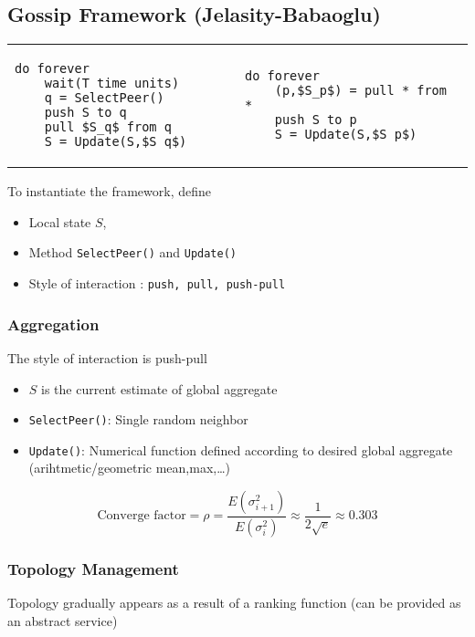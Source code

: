 \subsection{Gossip Framework (Jelasity-Babaoglu)}
\begin{tabular}{m{0.5\linewidth}m{0.5\linewidth}}
\begin{lstlisting}[caption={Active thread}, mathescape]
do forever
    wait(T time units)
    q = SelectPeer()
    push S to q
    pull $S_q$ from q
    S = Update(S,$S_q$)
\end{lstlisting}
&
\begin{lstlisting}[caption={Passive thread}, mathescape]
do forever
    (p,$S_p$) = pull * from *
    push S to p
    S = Update(S,$S_p$)
\end{lstlisting}
\end{tabular}

To instantiate the framework, define
\begin{itemize}
	\item Local state $S$,
	\item Method \texttt{SelectPeer()} and \texttt{Update()}
	\item Style of interaction : \texttt{push, pull, push-pull}
\end{itemize}

\subsubsection{Aggregation}
The style of interaction is push-pull
\begin{itemize}
	\item $S$ is the current estimate of global aggregate
	\item \texttt{SelectPeer()}: Single random neighbor
	\item \texttt{Update()}: Numerical function defined according to desired global
	aggregate (arihtmetic/geometric mean,max,\ldots)
\end{itemize}

$$ \textrm{Converge factor} = \rho = \frac{E(\sigma^2_{i+1})}{E(\sigma^2_i)} \approx \frac{1}{2 \sqrt{e}} \approx 0.303 $$


\subsubsection{Topology Management}

Topology gradually appears as a result of a ranking function (can be provided
as an abstract service)

